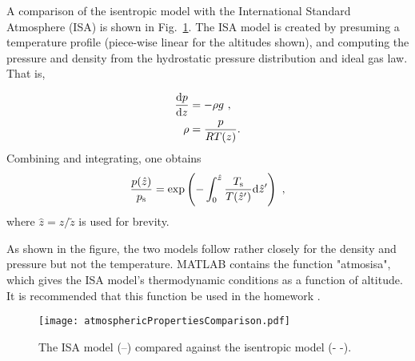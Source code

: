 A comparison of the isentropic model with the International Standard Atmosphere (ISA) is shown in Fig.~\ref{FIG_ISAISENCOMPARE}. The ISA model is created by presuming a temperature profile (piece-wise linear for the altitudes shown), and computing the pressure and density from the hydrostatic pressure distribution and ideal gas law. That is,

\begin{equation}
	\begin{aligned}
		\frac{\textup d p}{\textup d z}&=-\rho g\ , \\
		\rho &= \frac{p}{RT(z)}.
	\end{aligned}
\end{equation}
Combining and integrating, one obtains
\begin{equation}
	\begin{aligned}
		\frac{p(\hat z)}{p_\mathrm{s}}=\exp\left(-\int_0^{\hat z} \frac{T_\mathrm{s}}{T(\hat z')}\textup d \hat z'\right)\ ,
	\end{aligned}
\end{equation}
where $\hat z=z/\tilde z$ is used for brevity.

As shown in the figure, the two models follow rather closely for the density and pressure but not the temperature. MATLAB contains the function "atmosisa", which gives the ISA model's thermodynamic conditions as a function of altitude. It is recommended that this function be used in the homework .

\begin{figure}[!h!]
	\begin{center}
		\texttt{[image: atmosphericPropertiesComparison.pdf]}
	\end{center}
	\caption{\label{FIG_ISAISENCOMPARE} The ISA model (--) compared against the isentropic model (- -).}
\end{figure}
